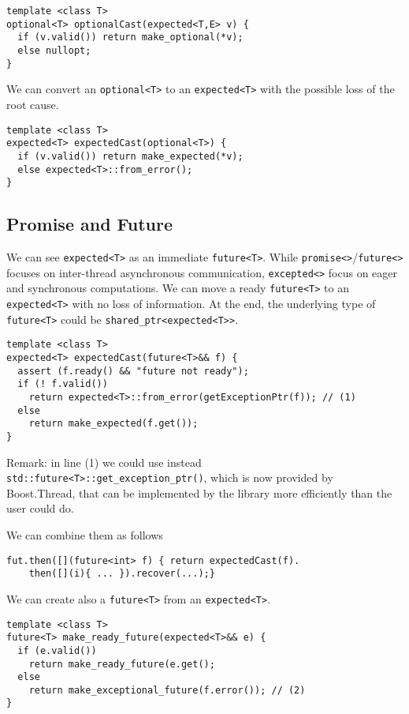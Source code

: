 \documentclass[a4paper,10pt]{article}
\newcommand{\cpp}[1]{\lstinline{#1}}
\begin{document}
\begin{lstlisting}
template <class T>
optional<T> optionalCast(expected<T,E> v) {
  if (v.valid()) return make_optional(*v);
  else nullopt;
}
\end{lstlisting}

We can convert an \cpp{optional<T>} to an \cpp{expected<T>} with the possible loss of the root cause.

\begin{lstlisting}
template <class T>
expected<T> expectedCast(optional<T>) {
  if (v.valid()) return make_expected(*v);
  else expected<T>::from_error();
}
\end{lstlisting}

\subsection{Promise and Future}

We can see \cpp{expected<T>} as an immediate \cpp{future<T>}.
While \cpp{promise<>}/\cpp{future<>} focuses on inter-thread asynchronous communication, \cpp{excepted<>} focus on eager and synchronous computations.
We can move a ready \cpp{future<T>} to an \cpp{expected<T>} with no loss of information. At the end, the underlying type of \cpp{future<T>} could be \cpp{shared_ptr<expected<T>>}.

\begin{lstlisting}
template <class T>
expected<T> expectedCast(future<T>&& f) {
  assert (f.ready() && "future not ready");
  if (! f.valid()) 
    return expected<T>::from_error(getExceptionPtr(f)); // (1)
  else 
    return make_expected(f.get());
}
\end{lstlisting}

Remark: in line (1) we could use instead \cpp{std::future<T>::get_exception_ptr()}, which is now provided by Boost.Thread, that can be implemented by the library more efficiently than the user could do.

We can combine them as follows

\begin{lstlisting}
fut.then([](future<int> f) { return expectedCast(f).
	then([](i){ ... }).recover(...);}
\end{lstlisting}

We can create also a \cpp{future<T>} from an \cpp{expected<T>}.

\begin{lstlisting}
template <class T>
future<T> make_ready_future(expected<T>&& e) {
  if (e.valid()) 
    return make_ready_future(e.get();
  else 
    return make_exceptional_future(f.error()); // (2)
}
\end{lstlisting}
\end{document}
